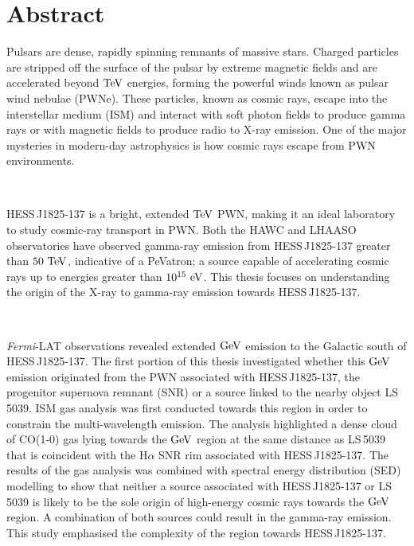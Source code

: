 \chapter{Abstract}
Pulsars are dense, rapidly spinning remnants of massive stars. Charged particles are stripped off the surface of the pulsar by extreme magnetic fields and are accelerated beyond $\TeV$ energies, forming the powerful winds known as pulsar wind nebulae (PWNe). These particles, known as cosmic rays, escape into the interstellar medium (ISM) and interact with soft photon fields to produce gamma rays or with magnetic fields to produce radio to X-ray emission.
One of the major mysteries in modern-day astrophysics is how cosmic rays escape from PWN environments.
\par~\par
\mbox{HESS\,J1825-137} is a bright, extended $\TeV$ PWN, making it an ideal laboratory to study cosmic-ray transport in PWN. Both the HAWC and LHAASO observatories have observed gamma-ray emission from \mbox{HESS\,J1825-137} greater than $50~\TeV$, indicative of a PeVatron; a source capable of accelerating cosmic rays up to energies greater than $10^{15}~\si{\electronvolt}$. This thesis focuses on understanding the origin of the X-ray to gamma-ray emission towards \mbox{HESS\,J1825-137}.
\par~\par
\textit{Fermi}-LAT observations revealed extended $\si{\giga\electronvolt}$ emission to the Galactic south of \mbox{HESS\,J1825-137}. The first portion of this thesis investigated whether this $\si{\giga\electronvolt}$ emission originated from the PWN associated with \mbox{HESS\,J1825-137}, the progenitor supernova remnant (SNR) or a source linked to the nearby object \mbox{LS\,5039}. ISM gas analysis was first conducted towards this region in order to constrain the multi-wavelength emission. The analysis highlighted a dense cloud of CO(1-0) gas lying towards the $\si{\giga\electronvolt}$ region at the same distance as \mbox{LS\,5039} that is coincident with the H$\alpha$ SNR rim associated with \mbox{HESS\,J1825-137}. The results of the gas analysis was combined with spectral energy distribution (SED) modelling to show that neither a source associated with \mbox{HESS\,J1825-137} or \mbox{LS\,5039} is likely to be the sole origin of high-energy cosmic rays towards the $\si{\giga\electronvolt}$ region. A combination of both sources could result in the gamma-ray emission. This study emphasised the complexity of the region towards \mbox{HESS\,J1825-137}.
